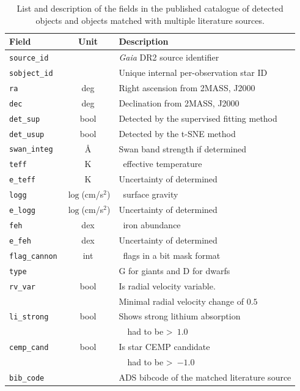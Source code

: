 \begin{table}
	\centering
	\caption{List and description of the fields in the published catalogue of detected objects and objects matched with multiple literature sources.}
	\label{tab:out_table}
	\begin{tabular}{l c l}
		\hline
		Field & Unit & Description \\ 
		\hline
		\texttt{source\_id} & & {\it Gaia} DR2 source identifier \\
		\texttt{sobject\_id} & & Unique internal per-observation star ID \\
		\texttt{ra} & deg & Right ascension from 2MASS, J2000 \\
		\texttt{dec} & deg & Declination from 2MASS, J2000 \\
		\texttt{det\_sup} & bool & Detected by the supervised fitting method \\
		\texttt{det\_usup} & bool & Detected by the t-SNE method \\
		\texttt{swan\_integ} & \AA & Swan band strength if determined \\
		\texttt{teff} & K & \TC\ effective temperature \Teff \\
		\texttt{e\_teff} & K & Uncertainty of determined \Teff \\
		\texttt{logg} & $\log$(cm/s$^{2}$) & \TC\ surface gravity \Logg \\
		\texttt{e\_logg} & $\log$(cm/s$^{2}$) & Uncertainty of determined \Logg \\
		\texttt{feh} & dex & \TC\ iron abundance \Feh \\
		\texttt{e\_feh} & dex & Uncertainty of determined \Feh \\
		\texttt{flag\_cannon} & int & \TC\ flags in a bit mask format \\
		\texttt{type} & & G for giants and D for dwarfs \\
		\texttt{rv\_var} & bool & Is radial velocity variable. \\
		 & & Minimal radial velocity change of $0.5$~\kms \\
		\texttt{li\_strong} & bool & Shows strong lithium absorption \\
		 & & \TC\ \Life\ had to be >~$1.0$ \\
		\texttt{cemp\_cand} & bool & Is star CEMP candidate \\
		 & & \TC\ \Feh\ had to be >~$-1.0$ \\
		\texttt{bib\_code} &  & ADS bibcode of the matched literature source \\
		\hline
	\end{tabular}
\end{table}

